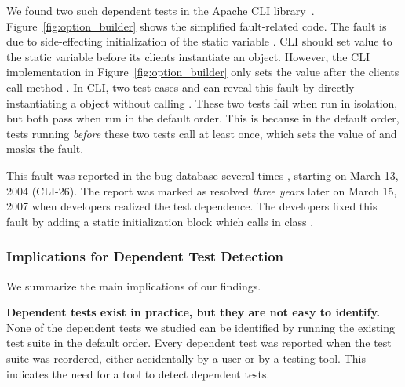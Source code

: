 We found two such dependent tests in
the Apache CLI library~\cite{cli, DBLP:conf/sigsoft/MusluSW11}.
Figure~\ref{fig:option_builder} shows the simplified fault-related
code. The fault is due to side-effecting initialization of the static variable
. CLI should set value  to
the static variable  before
its clients instantiate an  object.
However, the CLI implementation in Figure~\ref{fig:option_builder} only sets the value
after the clients call method . 
In CLI, two test cases 
 and 
can reveal this fault by directly instantiating
a  object without calling .
These two tests fail when run in isolation,
but both pass when run in the default order. This is because
in the default order, tests running \emph{before} these
two tests call  at least once, which sets
the value of  and masks the fault.


This fault was reported in the bug database several times \cite{clibug},
starting on March 13, 2004 (CLI-26). The report was marked as resolved
\emph{three years} later on March 15, 2007 when developers
realized the test dependence. The developers fixed this
fault by adding a static initialization block which
calls  in class .



\subsubsection{Implications for Dependent Test Detection}

We summarize the main implications of our findings.

\noindent \textbf{{Dependent tests exist in practice, but
they are not easy to identify.}}
None of the dependent tests we studied can be identified by
running the existing test suite in the default order. 
Every dependent test was reported when the
test suite was reordered, either accidentally by a user or
by a testing tool. This indicates the need
for a tool to detect dependent tests.

